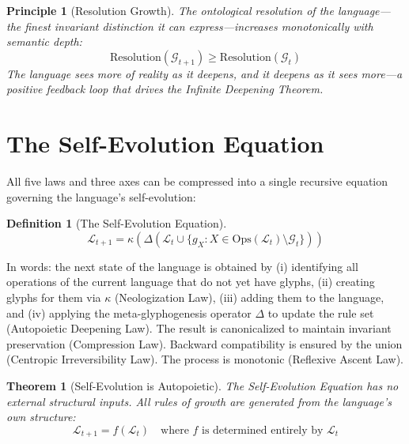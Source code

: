 \documentclass[12pt, letterpaper]{book}
\def\mathfrak#1{#1}%
\newtheorem{theorem}{Theorem}[chapter]
\newtheorem{definition}{Definition}[chapter]
\newtheorem{principle}{Principle}[chapter]
\begin{document}
\begin{principle}[Resolution Growth]\label{pr:resolution}
The ontological resolution of the language---the finest invariant distinction it can express---increases monotonically with semantic depth:
\[
\mathrm{Resolution}(\mathcal{G}_{t+1}) \geq \mathrm{Resolution}(\mathcal{G}_t)
\]
The language sees more of reality as it deepens, and it deepens as it sees more---a positive feedback loop that drives the Infinite Deepening Theorem.
\end{principle}

\section{The Self-Evolution Equation}

All five laws and three axes can be compressed into a single recursive equation governing the language's self-evolution:

\begin{definition}[The Self-Evolution Equation]\label{def:self-evo-eq}
\[
\boxed{\mathcal{L}_{t+1} = \kappa\!\left(\Delta\!\left(\mathcal{L}_t \cup \{\mathfrak{g}_X : X \in \mathrm{Ops}(\mathcal{L}_t) \setminus \mathcal{G}_t\}\right)\right)}
\]
\end{definition}

In words: the next state of the language is obtained by (i) identifying all operations of the current language that do not yet have glyphs, (ii) creating glyphs for them via $\kappa$ (Neologization Law), (iii) adding them to the language, and (iv) applying the meta-glyphogenesis operator $\Delta$ to update the rule set (Autopoietic Deepening Law). The result is canonicalized to maintain invariant preservation (Compression Law). Backward compatibility is ensured by the union (Centropic Irreversibility Law). The process is monotonic (Reflexive Ascent Law).

\begin{theorem}[Self-Evolution is Autopoietic]\label{thm:self-evo-autopoietic}
The Self-Evolution Equation has no external \textit{structural} inputs. All \textit{rules} of growth are generated from the language's own structure:
\[
\mathcal{L}_{t+1} = f(\mathcal{L}_t) \quad\text{where } f \text{ is determined entirely by } \mathcal{L}_t
\]
\end{theorem}
\end{document}
